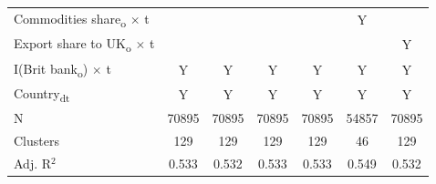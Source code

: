 {\begin{tabular}{l*{6}{c}}
Commodities share\textsubscript{o} $\times$ t&               &               &               &               &           Y   &               \\
Export share to UK\textsubscript{o} $\times$ t&               &               &               &               &               &           Y   \\
I(Brit bank\textsubscript{o}) $\times$ t&           Y   &           Y   &           Y   &           Y   &           Y   &           Y   \\
Country\textsubscript{dt}&           Y   &           Y   &           Y   &           Y   &           Y   &           Y   \\
\midrule
N           &       70895   &       70895   &       70895   &       70895   &       54857   &       70895   \\
Clusters    &         129   &         129   &         129   &         129   &          46   &         129   \\
Adj. R{$^2$}&       0.533   &       0.532   &       0.533   &       0.533   &       0.549   &       0.532   \\
\bottomrule
\end{tabular}
}
